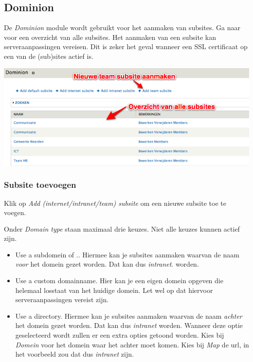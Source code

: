 \subsection{Dominion}\label{dominion}
De \emph{Dominion} module wordt gebruikt voor het aanmaken van subsites. Ga naar  voor een overzicht van alle subsites. Het aanmaken van een subsite kan serveraanpassingen vereisen. Dit is zeker het geval wanneer een SSL certificaat op een van de (sub)sites actief is.

\bigskip

\begin{center}
	\includegraphics[width=\textwidth]{img/dominion1.png}
\end{center}

\subsubsection{Subsite toevoegen}\label{teamsubsitetoevoegen}
Klik op \emph{Add (internet/intranet/team) subsite} om een nieuwe subsite toe te voegen. 

Onder \emph{Domain type} staan maximaal drie keuzes. Niet alle keuzes kunnen actief zijn.

\begin{itemize}
\item Use a subdomein of .\drupalpath{}. Hiermee kan je subsites aanmaken waarvan de naam \emph{voor} het domein gezet worden. Dat kan dus \emph{intranet}.\drupalpath{} worden.
\item Use a custom domainname. Hier kan je een eigen domein opgeven die helemaal losstaat van het huidige domein. Let wel op dat hiervoor serveraanpassingen vereist zijn.
\item Use a directory. Hiermee kan je subsites aanmaken waarvan de naam \emph{achter} het domein gezet worden. Dat kan dus \drupalpath{}\emph{intranet} worden. Wanneer deze optie geselecteerd wordt zullen er een extra opties getoond worden. Kies bij \emph{Domein} voor het domein waar het achter moet komen. Kies bij \emph{Map} de url, in het voorbeeld zou dat dus \emph{intranet} zijn. 
\end{itemize}

